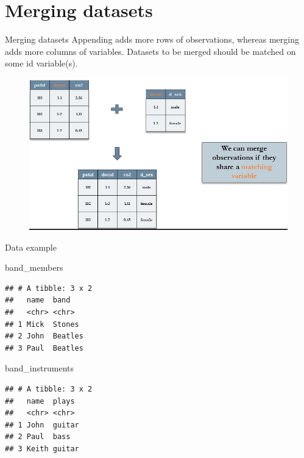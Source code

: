 \documentclass[
  ignorenonframetext,
]{beamer}
\newenvironment{Shaded}{\begin{snugshade}}{\end{snugshade}}
\newcommand{\NormalTok}[1]{#1}
\begin{document}
\hypertarget{merging-datasets}{%
\section{Merging datasets}\label{merging-datasets}}

\begin{frame}{Merging datasets}
\protect\hypertarget{merging-datasets-1}{}
Appending adds more rows of observations, whereas merging adds more
columns of variables. Datasets to be merged should be matched on some id
variable(s).

\begin{figure}
\includegraphics[width=.83\linewidth]{images/merge.png}
\end{figure}
\end{frame}

\begin{frame}[fragile]{Data example}
\protect\hypertarget{data-example}{}
\footnotesize

\begin{Shaded}
\begin{Highlighting}[]
\NormalTok{band\_members}
\end{Highlighting}
\end{Shaded}

\begin{verbatim}
## # A tibble: 3 x 2
##   name  band   
##   <chr> <chr>  
## 1 Mick  Stones 
## 2 John  Beatles
## 3 Paul  Beatles
\end{verbatim}

\begin{Shaded}
\begin{Highlighting}[]
\NormalTok{band\_instruments}
\end{Highlighting}
\end{Shaded}

\begin{verbatim}
## # A tibble: 3 x 2
##   name  plays 
##   <chr> <chr> 
## 1 John  guitar
## 2 Paul  bass  
## 3 Keith guitar
\end{verbatim}

\normalsize
\end{frame}
\end{document}
